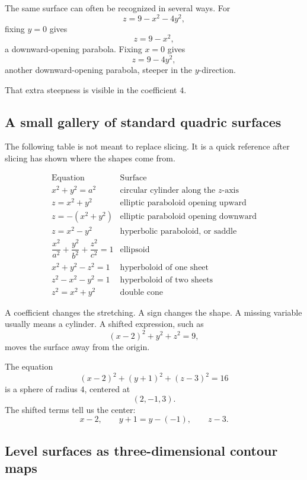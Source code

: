The same surface can often be recognized in several ways.  For
\[
    z=9-x^2-4y^2,
\]
fixing \(y=0\) gives
\[
    z=9-x^2,
\]
a downward-opening parabola.  Fixing \(x=0\) gives
\[
    z=9-4y^2,
\]
another downward-opening parabola, steeper in the \(y\)-direction.

That extra steepness is visible in the coefficient \(4\).

\subsection{A small gallery of standard quadric surfaces}

The following table is not meant to replace slicing.  It is a quick reference after slicing
has shown where the shapes come from.

\[
\begin{array}{c|c}
\text{Equation} & \text{Surface} \\ \hline
x^2+y^2=a^2 & \text{circular cylinder along the }z\text{-axis}\\[1mm]
z=x^2+y^2 & \text{elliptic paraboloid opening upward}\\[1mm]
z=-(x^2+y^2) & \text{elliptic paraboloid opening downward}\\[1mm]
z=x^2-y^2 & \text{hyperbolic paraboloid, or saddle}\\[1mm]
\dfrac{x^2}{a^2}+\dfrac{y^2}{b^2}+\dfrac{z^2}{c^2}=1
& \text{ellipsoid}\\[4mm]
x^2+y^2-z^2=1 & \text{hyperboloid of one sheet}\\[1mm]
z^2-x^2-y^2=1 & \text{hyperboloid of two sheets}\\[1mm]
z^2=x^2+y^2 & \text{double cone}
\end{array}
\]

A coefficient changes the stretching.  A sign changes the shape.  A missing variable
usually means a cylinder.  A shifted expression, such as
\[
    (x-2)^2+y^2+z^2=9,
\]
moves the surface away from the origin.

\begin{example}
The equation
\[
    (x-2)^2+(y+1)^2+(z-3)^2=16
\]
is a sphere of radius \(4\), centered at
\[
    (2,-1,3).
\]
The shifted terms tell us the center:
\[
    x-2,\qquad y+1=y-(-1),\qquad z-3.
\]
\end{example}

\subsection{Level surfaces as three-dimensional contour maps}

